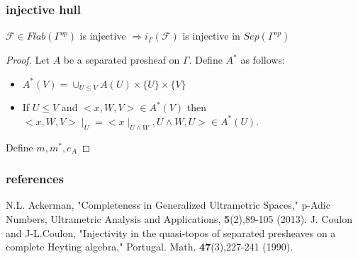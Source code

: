 \documentclass{beamer}
\begin{document}
\begin{frame}
\frametitle{injective hull}
$\mathcal{F} \in Flab(\Gamma^{op})$ is injective $\Rightarrow i_\Gamma(\mathcal{F})$ is injective in $Sep(\Gamma^{op})$ 
\begin{proof}
Let $A$ be a separated presheaf on $\Gamma$. Define $A^*$ as follows:
\begin{itemize}
	\item $A^*(V)=\cup_{U\leq V} A(U) \times \{U\} \times \{V\}$
	\item If $U \leq V$ and $<x,W,V> \in A^*(V)$ then $<x, W,V>\mid_U = <x\mid_{U\wedge W}, U \wedge W,U> \in A^*(U)$.
\end{itemize}

Define $m,m^*,e_A$
\end{proof}	
\end{frame}


\begin{frame}
\frametitle{references}
\begin{thebibliography}{1}
	 N.L. Ackerman, "Completeness in Generalized Ultrametric Spaces," p-Adic Numbers, Ultrametric Analysis and Applications, \textbf{5}(2),89-105 (2013).
 J. Coulon and J-L.Coulon, "Injectivity in the quasi-topos of separated presheaves on a complete Heyting algebra," Portugal. Math. \textbf{47}(3),227-241 (1990).
\end{thebibliography}
\end{frame}
\end{document}
